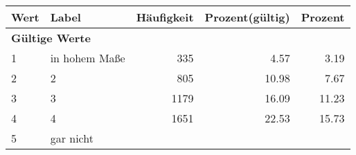      \begin{longtable}{lXrrr}
     \toprule
     \textbf{Wert} & \textbf{Label} & \textbf{Häufigkeit} & \textbf{Prozent(gültig)} & \textbf{Prozent} \\
     \endhead
     \midrule
     \multicolumn{5}{l}{\textbf{Gültige Werte}}\\

     1 &
     \multicolumn{1}{X}{ in hohem Maße   } &


       \num{335} &
       \num[round-mode=places,round-precision=2]{4.57} &
         \num[round-mode=places,round-precision=2]{3.19} \\

     2 &
     \multicolumn{1}{X}{ 2   } &


       \num{805} &
       \num[round-mode=places,round-precision=2]{10.98} &
         \num[round-mode=places,round-precision=2]{7.67} \\

     3 &
     \multicolumn{1}{X}{ 3   } &


       \num{1179} &
       \num[round-mode=places,round-precision=2]{16.09} &
         \num[round-mode=places,round-precision=2]{11.23} \\

     4 &
     \multicolumn{1}{X}{ 4   } &


       \num{1651} &
       \num[round-mode=places,round-precision=2]{22.53} &
         \num[round-mode=places,round-precision=2]{15.73} \\

     5 &
     \multicolumn{1}{X}{ gar nicht   } &



\end{longtable}
